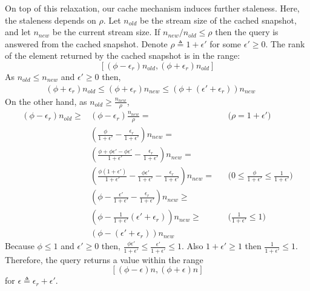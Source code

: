 On top of this relaxation, our cache mechanism induces further staleness. Here, the staleness depends on $\rho$. Let $n_{old}$ be the stream size of the cached snapshot, and let $n_{new}$ be the current stream size. If $n_{new} / n_{old} \leq \rho$ then the query is answered from the cached snapshot.
Denote $\rho \triangleq 1+\epsilon'$ for some $\epsilon' \geq 0 $. The rank of the element returned by the cached snapshot is in the range:
\begin{equation}
\left[\left(\phi-\epsilon_r\right)n_{old},\left(\phi+\epsilon_r\right)n_{old}\right]
\end{equation}
As $n_{old} \leq n_{new}$ and $\epsilon' \geq 0 $ then, 
\begin{align}
\left(\phi+\epsilon_r\right)n_{old} \leq \left(\phi+\epsilon_r\right)n_{new} \leq \left(\phi+\left(\epsilon'+\epsilon_r\right)\right)n_{new} &&
\end{align}
On the other hand, as $n_{old} \geq \frac{n_{new}}{\rho}$,
\begin{align}
\left(\phi-\epsilon_r\right)n_{old} \geq &\left(\phi-\epsilon_r\right)\frac{n_{new}}{\rho}= &&\text{($\rho = 1+\epsilon'$)} \\
&\left(\frac{\phi}{1+\epsilon'}-\frac{\epsilon_r}{1+\epsilon'}\right)n_{new}= && \\
&\left(\frac{\phi+\phi\epsilon'-\phi\epsilon'}{1+\epsilon'}-\frac{\epsilon_r}{1+\epsilon'}\right)n_{new}= && \\
&\left(\frac{\phi(1+\epsilon')}{1+\epsilon'}-\frac{\phi\epsilon'}{1+\epsilon'}-\frac{\epsilon_r}{1+\epsilon'}\right)n_{new}= &&\text{($0\leq \frac{\phi}{1+\epsilon'} \leq \frac{1}{1+\epsilon'}$)} \\
&\left(\phi-\frac{\epsilon'}{1+\epsilon'}-\frac{\epsilon_r}{1+\epsilon'}\right)n_{new} \geq && \\
&\left(\phi-\frac{1}{1+\epsilon'}\left(\epsilon'+\epsilon_r\right)\right)n_{new} \geq &&\text{($\frac{1}{1+\epsilon'} \leq 1$)} \\
&\left(\phi-\left(\epsilon'+\epsilon_r\right)\right)n_{new} &&
\end{align}
Because $\phi \leq 1$ and $\epsilon' \geq 0$ then, $\frac{\phi\epsilon'}{1+\epsilon'} \leq \frac{\epsilon'}{1+\epsilon'} \leq 1$. Also $1+\epsilon' \geq 1$ then $\frac{1}{1+\epsilon'} \leq 1$.\\
Therefore, the query returns a value within the range
\begin{equation}
    \left[\left(\phi-\epsilon \right)n,\left(\phi+\epsilon \right)n\right]
\end{equation}
for $\epsilon \triangleq \epsilon_r + \epsilon'$.

